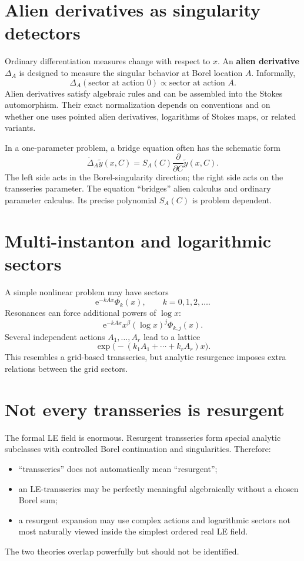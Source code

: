 \documentclass[11pt,openany]{book}
\theoremstyle{plain}
\theoremstyle{definition}
\theoremstyle{remark}
\newcommand{\e}{\mathrm{e}}
\newcommand{\defterm}[1]{\textbf{#1}}
\begin{document}
\section{Alien derivatives as singularity detectors}
Ordinary differentiation measures change with respect to $x$. An \defterm{alien derivative} $\Delta_A$ is designed to measure the singular behavior at Borel location $A$. Informally,
\[
  \Delta_A(\text{sector at action }0)
  \propto
  \text{sector at action }A.
\]
Alien derivatives satisfy algebraic rules and can be assembled into the Stokes automorphism. Their exact normalization depends on conventions and on whether one uses pointed alien derivatives, logarithms of Stokes maps, or related variants.

\begin{advancedbox}
In a one-parameter problem, a bridge equation often has the schematic form
\[
  \dot\Delta_A\widetilde y(x,C)
  =S_A(C)\frac{\partial}{\partial C}
   \widetilde y(x,C).
\]
The left side acts in the Borel-singularity direction; the right side acts on the transseries parameter. The equation ``bridges'' alien calculus and ordinary parameter calculus. Its precise polynomial $S_A(C)$ is problem dependent.
\end{advancedbox}

\section{Multi-instanton and logarithmic sectors}
A simple nonlinear problem may have sectors
\[
  \e^{-kAx}\Phi_k(x),
  \qquad k=0,1,2,\ldots.
\]
Resonances can force additional powers of $\log x$:
\[
  \e^{-kAx}x^\beta(\log x)^j\Phi_{k,j}(x).
\]
Several independent actions $A_1,\ldots,A_r$ lead to a lattice
\[
  \exp\bigl(-(k_1A_1+\cdots+k_rA_r)x\bigr).
\]
This resembles a grid-based transseries, but analytic resurgence imposes extra relations between the grid sectors.

\section{Not every transseries is resurgent}
The formal LE field is enormous. Resurgent transseries form special analytic subclasses with controlled Borel continuation and singularities. Therefore:
\begin{itemize}
\item ``transseries'' does not automatically mean ``resurgent'';
\item an LE-transseries may be perfectly meaningful algebraically without a chosen Borel sum;
\item a resurgent expansion may use complex actions and logarithmic sectors not most naturally viewed inside the simplest ordered real LE field.
\end{itemize}
The two theories overlap powerfully but should not be identified.
\end{document}
